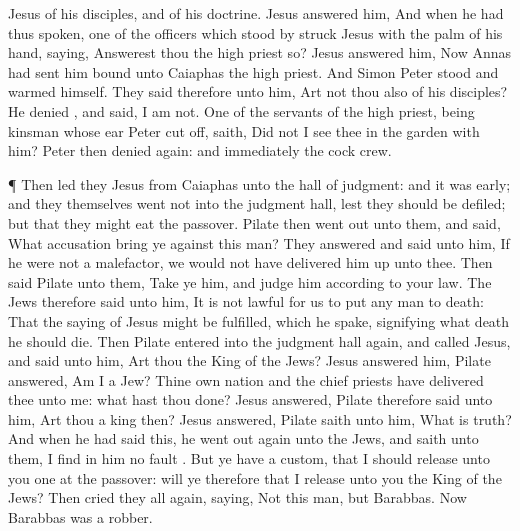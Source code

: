 {Jesus
of
his
disciples,
and
of
his
doctrine.
Jesus
answered
him,
{}
And
when
he
had
thus
spoken,
one of the
officers which stood
by
struck
Jesus with the palm of his
hand,
saying, Answerest
thou the high
priest
so?
Jesus
answered
him,
{}
Now
Annas had
sent
him
bound
unto
Caiaphas the high
priest.
And
Simon
Peter
stood
and warmed
himself. They
said
therefore unto
him,
Art
not
thou
also
{}
of
his
disciples?
He
denied
{},
and
said, I
am
not.
One
of the
servants of the high
priest,
being
{}
kinsman
whose
ear
Peter cut
off,
saith,
Did
not
I
see
thee
in the
garden
with
him?
Peter
then
denied
again:
and
immediately the
cock
crew.
\par }{\PP {}¶
Then led
they
Jesus
from
Caiaphas
unto the hall of
judgment:
and it
was
early;
and
they
themselves
went
not
into the judgment
hall,
lest they should be
defiled;
but
that they might
eat the
passover.
Pilate
then went
out
unto
them,
and
said,
What
accusation bring
ye
against
this
man?
They
answered
and
said unto
him,
If
he
were
not a
malefactor, we
would
not have
delivered
him up unto
thee.
Then
said
Pilate unto
them,
Take
ye
him,
and
judge
him according
to
your
law. The
Jews
therefore said
unto
him, It
is
not lawful for
us to
put any
man to
death:
That the
saying of
Jesus might be
fulfilled,
which he
spake,
signifying
what
death he
should
die.
Then
Pilate
entered
into the judgment
hall
again,
and
called
Jesus,
and
said unto
him,
Art
thou the
King of the
Jews?
Jesus
answered
him,
{}
Pilate
answered,
Am
I a
Jew? Thine
own
nation
and the chief
priests have
delivered
thee unto
me:
what hast thou
done?
Jesus
answered,
{}
Pilate
therefore
said unto
him,
Art
thou a
king
then?
Jesus
answered,
{}
Pilate
saith unto
him,
What
is
truth?
And when he had
said
this, he went
out
again
unto the
Jews,
and
saith unto
them,
I
find
in
him
no
fault
{}.
But ye
have a
custom,
that I should
release
unto
you
one
at the
passover: will
ye
therefore that I
release unto
you the
King of the
Jews?
Then cried
they
all
again,
saying,
Not this
man,
but
Barabbas.
Now
Barabbas
was a
robber.

}
